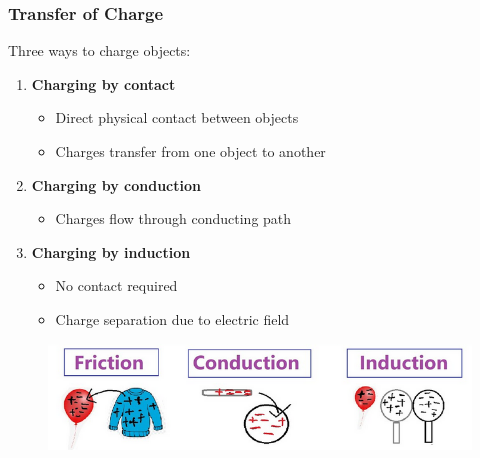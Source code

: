 \documentclass{beamer}
\begin{document}
\begin{frame}
    \frametitle{Transfer of Charge}
    Three ways to charge objects:
    \begin{enumerate}
        \item \textbf{Charging by contact}
            \begin{itemize}
                \item Direct physical contact between objects
                \item Charges transfer from one object to another
            \end{itemize}
        \item \textbf{Charging by conduction}
            \begin{itemize}
                \item Charges flow through conducting path
            \end{itemize}
        \item \textbf{Charging by induction}
            \begin{itemize}
                \item No contact required
                \item Charge separation due to electric field
            \end{itemize}
    \end{enumerate}
    
    
       \begin{figure}
           \centering
           \includegraphics[width=1\linewidth]{chchcr.png}
       \end{figure}
    
\end{frame}
\end{document}

